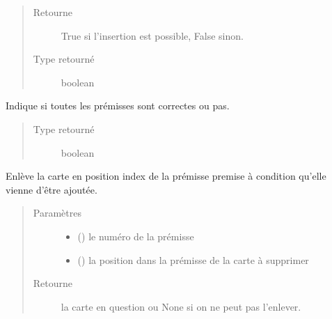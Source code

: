 \documentclass[letterpaper,10pt,french]{sphinxmanual}
\begin{document}
\begin{fulllineitems}
\begin{fulllineitems}
\begin{quote}
\begin{description}
\begin{itemize}
\end{itemize}

\item[{Retourne}] \leavevmode
True si l’insertion est possible, False sinon.

\item[{Type retourné}] \leavevmode
boolean

\end{description}\end{quote}

\end{fulllineitems}


\begin{fulllineitems}
\label{\detokenize{doc_classe:cards.Proof.is_all_correct}}
Indique si toutes les prémisses sont correctes ou pas.
\begin{quote}\begin{description}
\item[{Type retourné}] \leavevmode
boolean

\end{description}\end{quote}

\end{fulllineitems}


\begin{fulllineitems}
\label{\detokenize{doc_classe:cards.Proof.pop}}
Enlève la carte en position index de la prémisse premise à
condition qu’elle vienne d’être ajoutée.
\begin{quote}\begin{description}
\item[{Paramètres}] \leavevmode\begin{itemize}
\item {} 
 () \textendash{} le numéro de la prémisse

\item {} 
 () \textendash{} la position dans la prémisse de la carte à supprimer

\end{itemize}

\item[{Retourne}] \leavevmode
la carte en question ou None si on ne peut pas l’enlever.


\end{description}
\end{quote}
\end{fulllineitems}
\end{fulllineitems}
\end{document}
